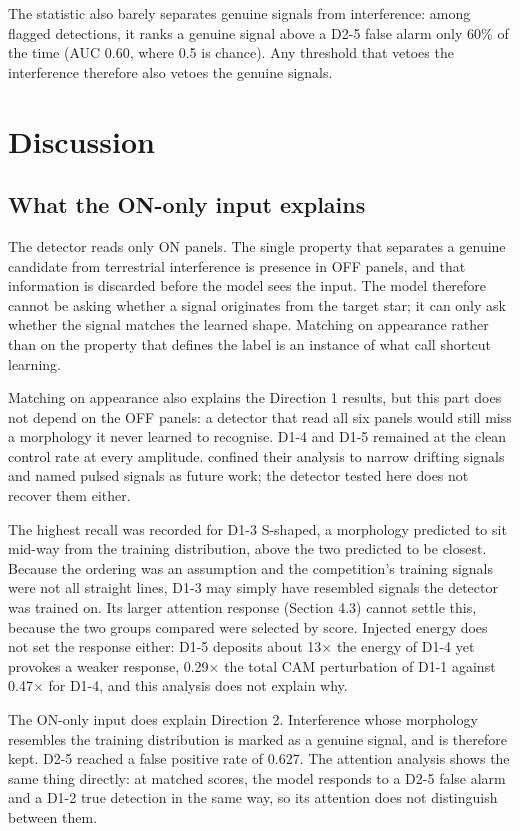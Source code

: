 \documentclass[11pt]{article}
\begin{document}
The statistic also barely separates genuine signals from interference: among flagged detections, it ranks a genuine signal above a D2-5 false alarm only 60\% of the time (AUC 0.60, where 0.5 is chance). Any threshold that vetoes the interference therefore also vetoes the genuine signals.

\section{Discussion}
\subsection{What the ON-only input explains}
The detector reads only ON panels. The single property that separates a genuine candidate from terrestrial interference is presence in OFF panels, and that information is discarded before the model sees the input. The model therefore cannot be asking whether a signal originates from the target star; it can only ask whether the signal matches the learned shape. Matching on appearance rather than on the property that defines the label is an instance of what \citet{geirhos2020} call shortcut learning.

Matching on appearance also explains the Direction 1 results, but this part does not depend on the OFF panels: a detector that read all six panels would still miss a morphology it never learned to recognise. D1-4 and D1-5 remained at the clean control rate at every amplitude. \citet{price2020} confined their analysis to narrow drifting signals and named pulsed signals as future work; the detector tested here does not recover them either.

The highest recall was recorded for D1-3 S-shaped, a morphology predicted to sit mid-way from the training distribution, above the two predicted to be closest. Because the ordering was an assumption and the competition's training signals were not all straight lines, D1-3 may simply have resembled signals the detector was trained on. Its larger attention response (Section 4.3) cannot settle this, because the two groups compared were selected by score. Injected energy does not set the response either: D1-5 deposits about 13$\times$ the energy of D1-4 yet provokes a weaker response, 0.29$\times$ the total CAM perturbation of D1-1 against 0.47$\times$ for D1-4, and this analysis does not explain why.

The ON-only input does explain Direction 2. Interference whose morphology resembles the training distribution is marked as a genuine signal, and is therefore kept. D2-5 reached a false positive rate of 0.627. The attention analysis shows the same thing directly: at matched scores, the model responds to a D2-5 false alarm and a D1-2 true detection in the same way, so its attention does not distinguish between them.
\end{document}
